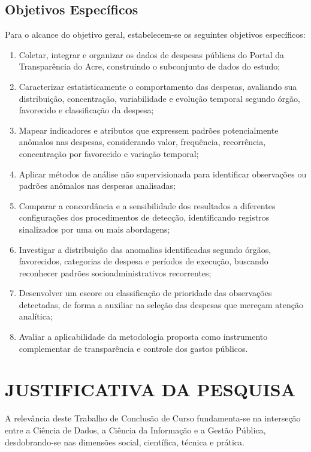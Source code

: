 \documentclass[
    12pt,               %
    openright,          %
    oneside,            %
    a4paper,            %
    chapter=TITLE,      %
    sumario=tradicional,%
    english,            %
    brazilian,          %
 ]{abntex2}
\begin{document}
\section{Objetivos Específicos}\label{sec:objetivos_especificos}
Para o alcance do objetivo geral, estabelecem-se os seguintes objetivos específicos:
\begin{enumerate}
    \item Coletar, integrar e organizar os dados de despesas públicas do Portal da Transparência do Acre, construindo o subconjunto de dados do estudo;
    \item Caracterizar estatisticamente o comportamento das despesas, avaliando sua distribuição, concentração, variabilidade e evolução temporal segundo órgão, favorecido e classificação da despesa;
    \item Mapear indicadores e atributos que expressem padrões potencialmente anômalos nas despesas, considerando valor, frequência, recorrência, concentração por favorecido e variação temporal;
    \item Aplicar métodos de análise não supervisionada para identificar observações ou padrões anômalos nas despesas analisadas;
    \item Comparar a concordância e a sensibilidade dos resultados a diferentes configurações dos procedimentos de detecção, identificando registros sinalizados por uma ou mais abordagens;
    \item Investigar a distribuição das anomalias identificadas segundo órgãos, favorecidos, categorias de despesa e períodos de execução, buscando reconhecer padrões socioadministrativos recorrentes;
    \item Desenvolver um escore ou classificação de prioridade das observações detectadas, de forma a auxiliar na seleção das despesas que mereçam atenção analítica;
    \item Avaliar a aplicabilidade da metodologia proposta como instrumento complementar de transparência e controle dos gastos públicos.
\end{enumerate}

\chapter{JUSTIFICATIVA DA PESQUISA}\label{sec:justificativa}

A relevância deste Trabalho de Conclusão de Curso fundamenta-se na interseção entre a Ciência de Dados, a Ciência da Informação e a Gestão Pública, desdobrando-se nas dimensões social, científica, técnica e prática.
\end{document}
